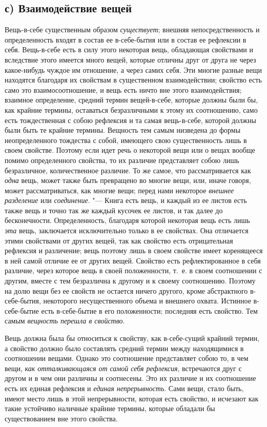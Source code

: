 \subsection[с) Взаимодействие вещей]{с) Взаимодействие вещей}
Вещь-в-себе существенным образом
{\em существует}; внешняя непосредственность и
определенность входят в состав ее в-себе-бытия или в состав ее рефлексии в
себя. Вещь-в-себе есть в силу этого некоторая вещь, обладающая свойствами и
вследствие этого имеется много вещей, которые отличны друг от друга не
через какое-нибудь чуждое им отношение, а через самих себя. Эти многие
разные вещи находятся благодаря их свойствам в существенном взаимодействии;
свойство есть само это взаимосоотношение, и вещь есть ничто вне этого
взаимодействия; взаимное определение, средний термин вещей-в-себе, которые
должны были бы, как крайние термины, оставаться безразличными к этому их
соотношению, само есть тождественная с собою рефлексия и та самая
вещь-в-себе, которой должны были быть те крайние термины. Вещность тем
самым низведена до формы неопределенного тождества с собой, имеющего свою
существенность лишь в своем свойстве. Поэтому если идет речь о некоторой
вещи или о вещах вообще помимо определенного свойства, то их различие
представляет собою лишь безразличное, количественное различие. То же самое,
что рассматривается как {\em одна} вещь, может также
быть превращено во многие вещи, или, иначе говоря, может рассматриваться,
как многие вещи; перед нами некоторое {\em внешнее
разделение} или {\em соединение}. "--- Книга есть вещь, и
каждый из ее листов есть также вещь и точно так же каждый кусочек ее
листов, и так далее до бесконечности. Определенность, благодаря которой
некоторая вещь есть лишь {\em эта} вещь, заключается
исключительно только в ее свойствах. Она отличается этими свойствами от
других вещей, так как свойство есть отрицательная рефлексия и различение;
вещь поэтому лишь в своем свойстве имеет коренящееся в ней самой отличие ее
от других вещей. Свойство есть рефлектированное в себя различие, через
которое вещь в своей положенности, т.~е. в своем соотношении с другим,
вместе с тем безразлична к другому и к своему соотношению. Поэтому на долю
вещи без ее свойств не остается ничего другого, кроме абстрактного
в-себе-бытия, некоторого несущественного объема и внешнего охвата. Истинное
в-себе-бытие есть в-себе-бытие в его положенности; последняя есть свойство.
Тем самым {\em вещность перешла в свойство}.

Вещь должна была бы относиться к свойству, как в-себе-сущий крайний термин,
а свойство должно было составлять средний термин между находящимися в
соотношении вещами. Однако это соотношение представляет собою то, в чем
вещи, {\em как отталкивающаяся от самой себя
рефлексия}, встречаются друг с другом и в чем они различны и соотнесены.
Это их различие и их соотношение есть их единая рефлексия и
{\em единая непрерывность}. Сами вещи, стало быть,
имеют место лишь в этой непрерывности, которая есть свойство, и исчезают
как такие устойчиво наличные крайние термины, которые обладали бы
существованием вне этого свойства.


